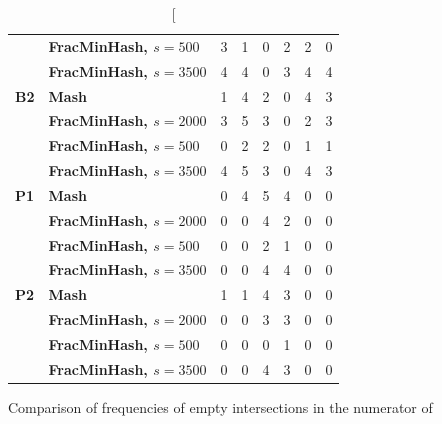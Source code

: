 \begin{table}[]
\begin{tabular}{@{}llrrrrrr@{}}
              & \textbf{FracMinHash, $s=500$}  & 3           & 1           & 0           & 2           & 2           & 0           \\
              & \textbf{FracMinHash, $s=3500$} & 4           & 4           & 0           & 3           & 4           & 4           \\ \midrule
  \textbf{B2} & \textbf{Mash}                  & 1           & 4           & 2           & 0           & 4           & 3           \\
  \textbf{}   & \textbf{FracMinHash, $s=2000$} & 3           & 5           & 3           & 0           & 2           & 3           \\
  \textbf{}   & \textbf{FracMinHash, $s=500$}  & 0           & 2           & 2           & 0           & 1           & 1           \\
  \textbf{}   & \textbf{FracMinHash, $s=3500$} & 4           & 5           & 3           & 0           & 4           & 3           \\ \midrule
  \textbf{P1} & \textbf{Mash}                  & 0           & 4           & 5           & 4           & 0           & 0           \\
  \textbf{}   & \textbf{FracMinHash, $s=2000$} & 0           & 0           & 4           & 2           & 0           & 0           \\
  \textbf{}   & \textbf{FracMinHash, $s=500$}  & 0           & 0           & 2           & 1           & 0           & 0           \\
  \textbf{}   & \textbf{FracMinHash, $s=3500$} & 0           & 0           & 4           & 4           & 0           & 0           \\ \midrule
  \textbf{P2} & \textbf{Mash}                  & 1           & 1           & 4           & 3           & 0           & 0           \\
  \textbf{}   & \textbf{FracMinHash, $s=2000$} & 0           & 0           & 3           & 3           & 0           & 0           \\
  \textbf{}   & \textbf{FracMinHash, $s=500$}  & 0           & 0           & 0           & 1           & 0           & 0           \\
              & \textbf{FracMinHash, $s=3500$} & 0           & 0           & 4           & 3           & 0           & 0           \\ \bottomrule
  \end{tabular}
  \caption[Comparison of frequencies of empty intersections in the numerator of

\end{table}
